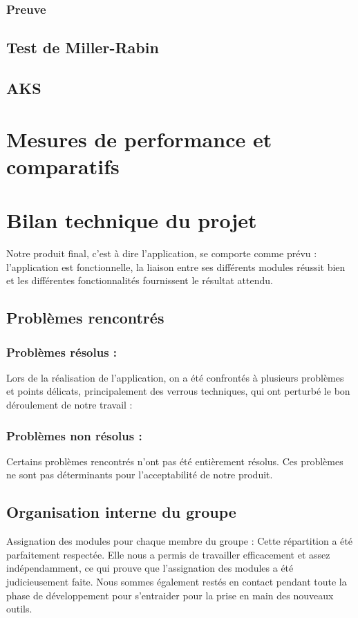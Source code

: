			\subsubsection{Preuve}
		
		\subsection{Test de Miller-Rabin}
		
		\subsection{AKS}
		
		
		
	\section{Mesures de performance et comparatifs}
	
		
		
	\section{Bilan technique du projet}
		Notre produit final, c'est à dire l'application, se comporte comme prévu : l'application est fonctionnelle, la liaison entre ses différents modules réussit bien et les différentes fonctionnalités fournissent le résultat attendu.		

		\subsection{Problèmes rencontrés}
			\subsubsection*{Problèmes résolus :} 
			Lors de la réalisation de l'application, on a été confrontés à plusieurs problèmes et points délicats, principalement des verrous techniques, qui ont perturbé le bon déroulement de notre travail :
				
			\subsubsection*{Problèmes non résolus :}
				Certains problèmes rencontrés n'ont pas été entièrement résolus. Ces problèmes ne sont pas déterminants pour l'acceptabilité de notre produit.
				
		\subsection{Organisation interne du groupe}
		Assignation des modules pour chaque membre du groupe :
		Cette répartition a été parfaitement respectée. Elle nous a permis de travailler efficacement et assez indépendamment, ce qui prouve que l'assignation des modules a été judicieusement faite. Nous sommes également restés en contact pendant toute la phase de développement pour s'entraider pour la prise en main des nouveaux outils.
	
